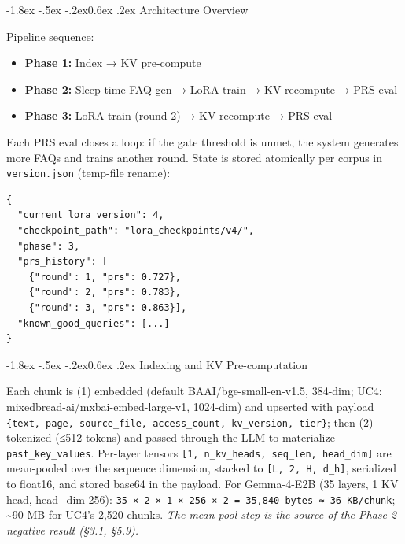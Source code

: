 \documentclass[10pt,twocolumn]{article}
\makeatletter
\providecommand{\tightlist}{\setlength{\itemsep}{0pt}\setlength{\parskip}{0pt}}
\renewcommand\subsection{\@startsection{subsection}{2}{\z@}%
  {-1.8ex \@plus -.5ex \@minus -.2ex}{0.6ex \@plus .2ex}%
  {\normalfont\normalsize\bfseries}}
\makeatother
\begin{document}
\hypertarget{architecture-overview}{%
\subsection{Architecture Overview}\label{architecture-overview}}

Pipeline sequence:

\begin{itemize}
\tightlist
\item
  \textbf{Phase 1:} Index → KV pre-compute
\item
  \textbf{Phase 2:} Sleep-time FAQ gen → LoRA train → KV recompute → PRS eval
\item
  \textbf{Phase 3:} LoRA train (round 2) → KV recompute → PRS eval
\end{itemize}

Each PRS eval closes a loop: if the gate threshold is unmet, the system generates more FAQs and trains another round. State is stored atomically per corpus in \texttt{version.json} (temp-file rename):

{\footnotesize
\begin{verbatim}
{
  "current_lora_version": 4,
  "checkpoint_path": "lora_checkpoints/v4/",
  "phase": 3,
  "prs_history": [
    {"round": 1, "prs": 0.727},
    {"round": 2, "prs": 0.783},
    {"round": 3, "prs": 0.863}],
  "known_good_queries": [...]
}
\end{verbatim}
}

\hypertarget{indexing-and-kv-pre-computation}{%
\subsection{Indexing and KV Pre-computation}\label{indexing-and-kv-pre-computation}}

Each chunk is (1) embedded (default BAAI/bge-small-en-v1.5, 384-dim; UC4: mixedbread-ai/mxbai-embed-large-v1, 1024-dim) and upserted with payload \texttt{\{text,\ page,\ source\_file,\ access\_count,\ kv\_version,\ tier\}}; then (2) tokenized (≤512 tokens) and passed through the LLM to materialize \texttt{past\_key\_values}. Per-layer tensors \texttt{{[}1,\ n\_kv\_heads,\ seq\_len,\ head\_dim{]}} are mean-pooled over the sequence dimension, stacked to \texttt{{[}L,\ 2,\ H,\ d\_h{]}}, serialized to float16, and stored base64 in the payload. For Gemma-4-E2B (35 layers, 1 KV head, head\_dim 256): \texttt{35\ ×\ 2\ ×\ 1\ ×\ 256\ ×\ 2\ =\ 35,840\ bytes\ ≈\ 36\ KB/chunk}; \textasciitilde90 MB for UC4's 2,520 chunks. \emph{The mean-pool step is the source of the Phase-2 negative result (§3.1, §5.9).}
\end{document}
